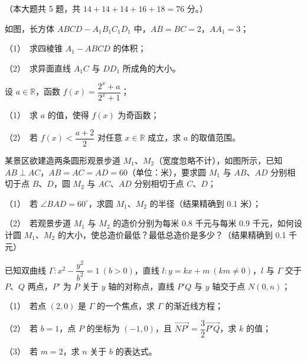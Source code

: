 （本大题共 5 题，共 $14+14+14+16+18=76$ 分。）

\Needspace{0.4\textheight}
\begin{question}
如图，长方体 $ABCD-A_1B_1C_1D_1$ 中，$AB=BC=2$，$AA_1=3$；
\nopagebreak[4]
\begin{center}\end{center}
\nopagebreak[4]
（1）　求四棱锥 $A_1-ABCD$ 的体积；

（2）　求异面直线 $A_1C$ 与 $DD_1$ 所成角的大小。

\end{question}
\begin{question}
设 $a\in\mathbb R$，函数 $f(x)=\dfrac{2^x+a}{2^x+1}$；

（1）　求 $a$ 的值，使得 $f(x)$ 为奇函数；

（2）　若 $f(x)<\dfrac{a+2}{2}$ 对任意 $x\in\mathbb R$ 成立，求 $a$ 的取值范围。

\Needspace{0.4\textheight}
\end{question}
\begin{question}
某景区欲建造两条圆形观景步道 $M_1\text{、}M_2$（宽度忽略不计），如图所示，已知 $AB\perp AC$，$AB=AC=AD=60$（单位：米），要求圆 $M_1$ 与 $AB\text{、}AD$ 分别相切于点 $B\text{、}D$，圆 $M_2$ 与 $AC\text{、}AD$ 分别相切于点 $C\text{、}D$；
\nopagebreak[4]
\begin{center}\end{center}
\nopagebreak[4]
（1）　若 $\angle BAD=60^\circ$，求圆 $M_1\text{、}M_2$ 的半径（结果精确到 0.1 米）；

（2）　若观景步道 $M_1$ 与 $M_2$ 的造价分别为每米 0.8 千元与每米 0.9 千元，如何设计圆 $M_1\text{、}M_2$ 的大小，使总造价最低？最低总造价是多少？（结果精确到 0.1 千元）

\end{question}
\begin{question}
已知双曲线 $\Gamma:x^2-\dfrac{y^2}{b^2}=1\ (b>0)$，直线 $l:y=kx+m\ (km\ne0)$，$l$ 与 $\Gamma$ 交于 $P\text{、}Q$ 两点，$P'$ 为 $P$ 关于 $y$ 轴的对称点，直线 $P'Q$ 与 $y$ 轴交于点 $N(0,n)$；

（1）　若点 $(2,0)$ 是 $\Gamma$ 的一个焦点，求 $\Gamma$ 的渐近线方程；

（2）　若 $b=1$，点 $P$ 的坐标为 $(-1,0)$，且 $\overrightarrow{NP'}=\dfrac32\overrightarrow{P'Q}$，求 $k$ 的值；

（3）　若 $m=2$，求 $n$ 关于 $b$ 的表达式。

\end{question}
